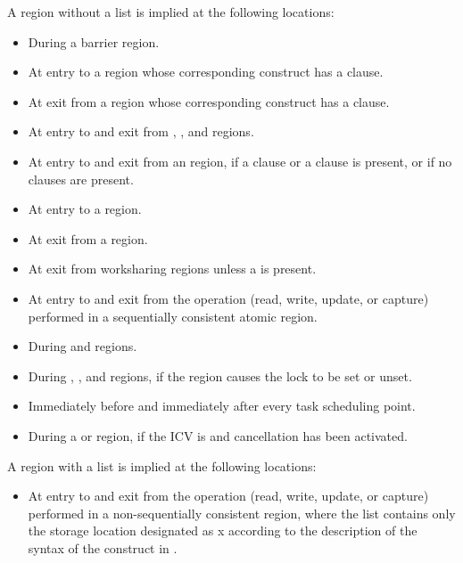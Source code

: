 {{{{A  region without a list is implied at the following locations:
\begin{itemize}
\item During a barrier region.
\item At entry to a  region whose corresponding construct has a  clause.
\item At exit from a  region whose corresponding construct has a  clause.
\item At entry to and exit from , ,  and  regions.
\item At entry to and exit from an  region, if a  clause or a  clause is present, or if no clauses are present.
\item At entry to a  region. 
\item At exit from a  region. 
\item At exit from worksharing regions unless a  is present.
\item At entry to and exit from the  operation (read, write, update, or capture) 
performed in a sequentially consistent atomic region.
\item During  and  regions.
\item During , ,  
and  regions, if the region causes the lock to be set or unset.
\item Immediately before and immediately after every task scheduling point.
\item During a  or  region, if the  ICV is  and cancellation has been activated.
\end{itemize}

A  region with a list is implied at the following locations:
\begin{itemize}
\item At entry to and exit from the  operation (read, write, update, or capture) 
performed in a non-sequentially consistent  region, where the list contains 
only the storage location designated as x according to the description of the syntax of 
the  construct in 
.
\end{itemize}

}}}}
